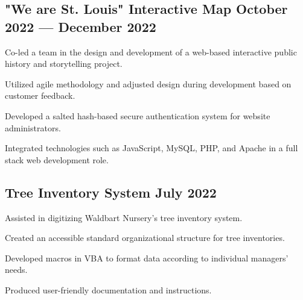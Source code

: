 
\subsection{{"We are St. Louis" Interactive Map \hfill October 2022 --- December 2022}}
\begin{zitemize}
\item Co-led a team in the design and development of a web-based interactive public history and storytelling project.
\item Utilized agile methodology and adjusted design during development based on customer feedback.
\item Developed a salted hash-based secure authentication system for website administrators.
\item Integrated technologies such as JavaScript, MySQL, PHP, and Apache in a full stack web development role.
\end{zitemize}


\subsection{{Tree Inventory System \hfill July 2022}}
\begin{zitemize}
\item Assisted in digitizing Waldbart Nursery's tree inventory system.
\item Created an accessible standard organizational structure for tree inventories.
\item Developed macros in VBA to format data according to individual managers' needs.
\item Produced user-friendly documentation and instructions.
\end{zitemize}

